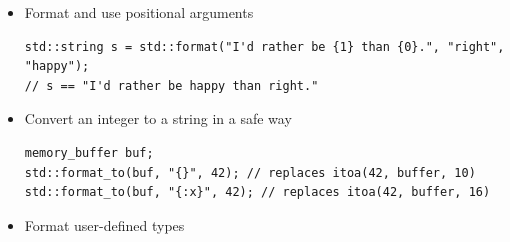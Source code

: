 \begin{itemize}
\item 
Format and use positional arguments

\begin{lstlisting}[style=styleCXX]
std::string s = std::format("I'd rather be {1} than {0}.", "right", "happy");
// s == "I'd rather be happy than right."
\end{lstlisting}

\item 
Convert an integer to a string in a safe way

\begin{lstlisting}[style=styleCXX]
memory_buffer buf;
std::format_to(buf, "{}", 42); // replaces itoa(42, buffer, 10)
std::format_to(buf, "{:x}", 42); // replaces itoa(42, buffer, 16)
\end{lstlisting}

\item 
Format user-defined types

\end{itemize}

